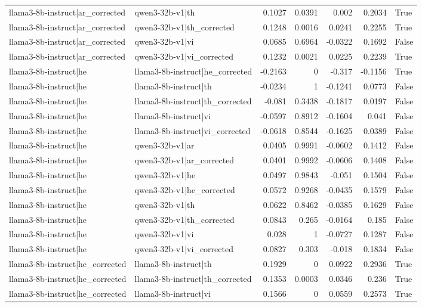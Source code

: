 \begin{table}
\begin{tabular}{l l r r r r l}
llama3-8b-instruct|ar_corrected & qwen3-32b-v1|th & 0.1027 & 0.0391 & 0.002 & 0.2034 & True \\
llama3-8b-instruct|ar_corrected & qwen3-32b-v1|th_corrected & 0.1248 & 0.0016 & 0.0241 & 0.2255 & True \\
llama3-8b-instruct|ar_corrected & qwen3-32b-v1|vi & 0.0685 & 0.6964 & -0.0322 & 0.1692 & False \\
llama3-8b-instruct|ar_corrected & qwen3-32b-v1|vi_corrected & 0.1232 & 0.0021 & 0.0225 & 0.2239 & True \\
llama3-8b-instruct|he & llama3-8b-instruct|he_corrected & -0.2163 & 0 & -0.317 & -0.1156 & True \\
llama3-8b-instruct|he & llama3-8b-instruct|th & -0.0234 & 1 & -0.1241 & 0.0773 & False \\
llama3-8b-instruct|he & llama3-8b-instruct|th_corrected & -0.081 & 0.3438 & -0.1817 & 0.0197 & False \\
llama3-8b-instruct|he & llama3-8b-instruct|vi & -0.0597 & 0.8912 & -0.1604 & 0.041 & False \\
llama3-8b-instruct|he & llama3-8b-instruct|vi_corrected & -0.0618 & 0.8544 & -0.1625 & 0.0389 & False \\
llama3-8b-instruct|he & qwen3-32b-v1|ar & 0.0405 & 0.9991 & -0.0602 & 0.1412 & False \\
llama3-8b-instruct|he & qwen3-32b-v1|ar_corrected & 0.0401 & 0.9992 & -0.0606 & 0.1408 & False \\
llama3-8b-instruct|he & qwen3-32b-v1|he & 0.0497 & 0.9843 & -0.051 & 0.1504 & False \\
llama3-8b-instruct|he & qwen3-32b-v1|he_corrected & 0.0572 & 0.9268 & -0.0435 & 0.1579 & False \\
llama3-8b-instruct|he & qwen3-32b-v1|th & 0.0622 & 0.8462 & -0.0385 & 0.1629 & False \\
llama3-8b-instruct|he & qwen3-32b-v1|th_corrected & 0.0843 & 0.265 & -0.0164 & 0.185 & False \\
llama3-8b-instruct|he & qwen3-32b-v1|vi & 0.028 & 1 & -0.0727 & 0.1287 & False \\
llama3-8b-instruct|he & qwen3-32b-v1|vi_corrected & 0.0827 & 0.303 & -0.018 & 0.1834 & False \\
llama3-8b-instruct|he_corrected & llama3-8b-instruct|th & 0.1929 & 0 & 0.0922 & 0.2936 & True \\
llama3-8b-instruct|he_corrected & llama3-8b-instruct|th_corrected & 0.1353 & 0.0003 & 0.0346 & 0.236 & True \\
llama3-8b-instruct|he_corrected & llama3-8b-instruct|vi & 0.1566 & 0 & 0.0559 & 0.2573 & True \\

\end{tabular}
\end{table}

